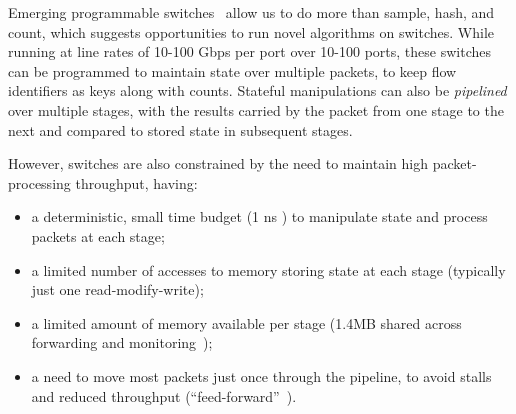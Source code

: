 Emerging programmable switches~\cite{RMT,barefoot-tofino,cavium-xpliant} allow
us to do more than sample, hash, and count, which suggests opportunities to run
novel algorithms on switches. While running at line rates of
10-100 Gbps per port over 10-100 ports, these switches can be programmed to
maintain state over multiple packets, \eg to keep flow identifiers as keys
along with counts. Stateful manipulations can also be {\em pipelined}
over multiple stages, with the results carried by the packet from one stage to
the next and compared to stored state in subsequent stages.

However, switches are also constrained by the need to maintain high
packet-processing throughput, having:
\begin{itemize}
\item a deterministic, small time budget (1 ns \cite{RMT}) to manipulate state
  and process packets at each stage;
\item a limited number of accesses to memory storing state at each stage (typically just one read-modify-write);
\item a limited amount of memory available per stage (\eg 1.4MB shared across forwarding and monitoring~\cite{RMT}); 
\item a need to move most packets just once through the pipeline, to
  avoid stalls and reduced throughput
  (``feed-forward''~\cite{minions}).
\end{itemize}



